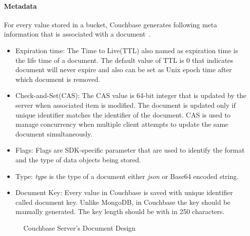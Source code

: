 \paragraph{Metadata}\label{cb-metadata}
For every value stored in a bucket, Couchbase generates following meta information that is associated with a document~\cite[p. 26]{cb/ostrovsky2014pro}. 
\begin{itemize}
	\item{Expiration time:}
		The Time to Live(TTL) also named as expiration time is the life time of a document. The default value of TTL is 0 that indicates document will never expire and also can be set as Unix epoch time after which document is removed.
	\item{Check-and-Set(CAS):}
		The CAS value is 64-bit integer that is updated by the server when associated item is modified. The document is updated only  if unique identifier matches the identifier of the document. CAS is used to manage concurrency when multiple client attempts to update the same document simultaneously. 
	\item{Flags:} 
Flags are SDK-specific parameter that are used to identify the format and the type of data objects being stored.
\item{Type:}
 \textit{type} is the type of a document either \textit{json} or Base64 encoded string.
 \item{Document Key:}
 Every value in Couchbase is saved with unique identifier called document key. Unlike MongoDB, in Couchbase the key should be manually generated. The key length should be with in 250 characters.
\end{itemize}	

\begin{figure}[h]
	\centering
	\centering
	\caption{Couchbase Server's Document Design ~\citep{couchbasedocs}}
	\label{fig:cb-views-document-design}	
\end{figure}

